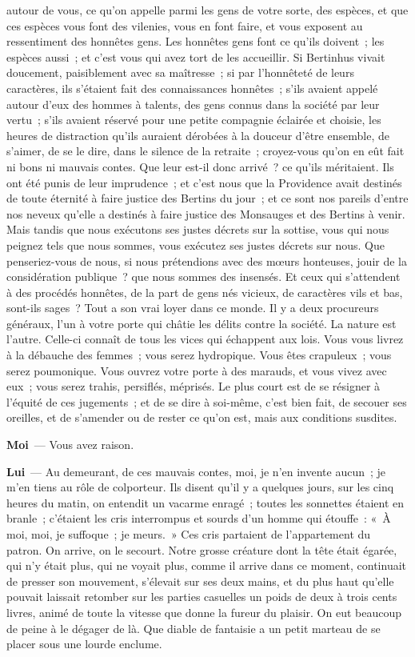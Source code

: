 \documentclass[french,twoside]{book} %
\newcommand{\labelchar}[1]{\textbf{\color{rubric} #1}}
\begin{document}
autour de vous, ce qu’on appelle parmi les gens de votre sorte, des espèces, et que ces espèces vous font des vilenies, vous en font faire, et vous exposent au ressentiment des honnêtes gens. Les honnêtes gens font ce qu’ils doivent ; les espèces aussi ; et c’est vous qui avez tort de les accueillir. Si Bertinhus vivait doucement, paisiblement avec sa maîtresse ; si par l’honnêteté de leurs caractères, ils s’étaient fait des connaissances honnêtes ; s’ils avaient appelé autour d’eux des hommes à talents, des gens connus dans la société par leur vertu ; s’ils avaient réservé pour une petite compagnie éclairée et choisie, les heures de distraction qu’ils auraient dérobées à la douceur d’être ensemble, de s’aimer, de se le dire, dans le silence de la retraite ; croyez-vous qu’on en eût fait ni bons ni mauvais contes. Que leur est-il donc arrivé ? ce qu’ils méritaient. Ils ont été punis de leur imprudence ; et c’est nous que la Providence avait destinés de toute éternité à faire justice des Bertins du jour ; et ce sont nos pareils d’entre nos neveux qu’elle a destinés à faire justice des Monsauges et des Bertins à venir. Mais tandis que nous exécutons ses justes décrets sur la sottise, vous qui nous peignez tels que nous sommes, vous exécutez ses justes décrets sur nous. Que penseriez-vous de nous, si nous prétendions avec des mœurs honteuses, jouir de la considération publique ? que nous sommes des insensés. Et ceux qui s’attendent à des procédés honnêtes, de la part de gens nés vicieux, de caractères vils et bas, sont-ils sages ? Tout a son vrai loyer dans ce monde. Il y a deux procureurs généraux, l’un à votre porte qui châtie les délits contre la société. La nature est l’autre. Celle-ci connaît de tous les vices qui échappent aux lois. Vous vous livrez à la débauche des femmes ; vous serez hydropique. Vous êtes crapuleux ; vous serez poumonique. Vous ouvrez votre porte à des marauds, et vous vivez avec eux ; vous serez trahis, persiflés, méprisés. Le plus court est de se résigner à l’équité de ces jugements ; et de se dire à soi-même, c’est bien fait, de secouer ses oreilles, et de s’amender ou de rester ce qu’on est, mais aux conditions susdites.\par
\labelchar{Moi} — Vous avez raison.\par
\labelchar{Lui} — Au demeurant, de ces mauvais contes, moi, je n’en invente aucun ; je m’en tiens au rôle de colporteur. Ils disent qu’il y a quelques jours, sur les cinq heures du matin, on entendit un vacarme enragé ; toutes les sonnettes étaient en branle ; c’étaient les cris interrompus et sourds d’un homme qui étouffe : « À moi, moi, je suffoque ; je meurs. » Ces cris partaient de l’appartement du patron. On arrive, on le secourt. Notre grosse créature dont la tête était égarée, qui n’y était plus, qui ne voyait plus, comme il arrive dans ce moment, continuait de presser son mouvement, s’élevait sur ses deux mains, et du plus haut qu’elle pouvait laissait retomber sur les parties casuelles un poids de deux à trois cents livres, animé de toute la vitesse que donne la fureur du plaisir. On eut beaucoup de peine à le dégager de là. Que diable de fantaisie a un petit marteau de se placer sous une lourde enclume.\par
\end{document}
